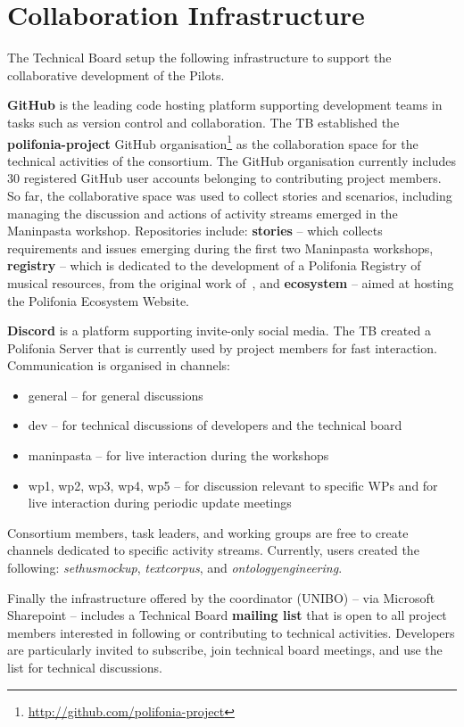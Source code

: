 \chapter{Collaboration Infrastructure}\label{ch:infrastructure}
The Technical Board setup the following infrastructure to support the collaborative development of the Pilots.

\textbf{GitHub} is the leading code hosting platform supporting development teams in tasks such as version control and collaboration. The TB established the \textbf{polifonia-project} GitHub organisation\footnote{\url{http://github.com/polifonia-project}} as the collaboration space for the technical activities of the consortium. The GitHub organisation currently includes 30 registered GitHub user accounts belonging to contributing project members.
So far, the collaborative space was used to collect stories and scenarios, including managing the discussion and actions of activity streams emerged in the Maninpasta workshop. Repositories include: \textbf{stories} -- which collects requirements and issues emerging during the first two Maninpasta workshops, \textbf{registry} -- which is dedicated to the development of a Polifonia Registry of musical resources, from the original work of~\cite{daquino2017characterizing}, and \textbf{ecosystem} -- aimed at hosting the Polifonia Ecosystem Website.

\textbf{Discord} is a platform supporting invite-only social media. The TB created a Polifonia Server that is currently used by project members for fast interaction. Communication is organised in channels:
\begin{itemize}
    \item general -- for general discussions
    \item dev -- for technical discussions of developers and the technical board
    \item maninpasta -- for live interaction during the workshops
    \item wp1, wp2, wp3, wp4, wp5 -- for discussion relevant to specific WPs and for live interaction during periodic update meetings
\end{itemize}
Consortium members, task leaders, and working groups are free to create channels dedicated to specific activity streams. Currently, users created the following: \textit{sethusmockup}, \textit{textcorpus}, and \textit{ontologyengineering}.

Finally the infrastructure offered by the coordinator (UNIBO) -- via Microsoft Sharepoint -- includes a Technical Board \textbf{mailing list} that is open to all project members interested in following or contributing to technical activities.
Developers are particularly invited to subscribe, join technical board meetings, and use the list for technical discussions.





